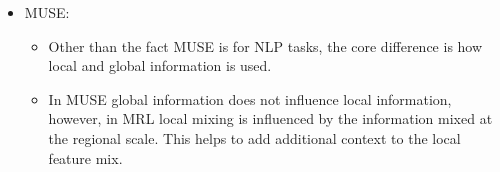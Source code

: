 \documentclass{article}
\begin{document}
\begin{itemize}
    \item MUSE\cite{muse}:
    \begin{itemize}
        \item Other than the fact MUSE is for NLP tasks, the core difference is how local and global information is used.
        \item In MUSE global information does not influence local information, however, in MRL local mixing is influenced by the information mixed at the regional scale. This helps to add additional context to the local feature mix.
    \end{itemize}
    
\end{itemize}
\end{document}
